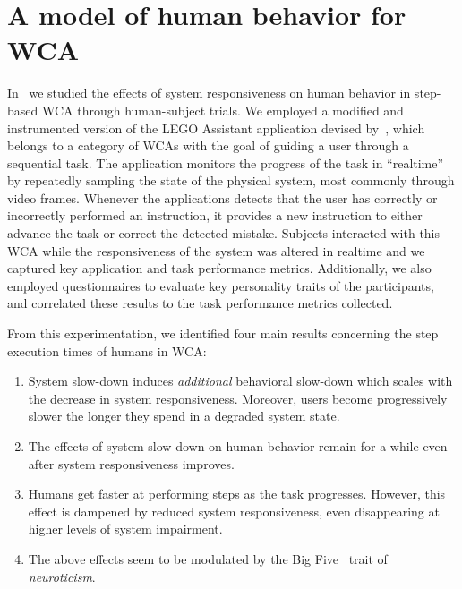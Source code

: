 \section{A model of human behavior for \acl*{WCA}}\label{sec:model}

In~\cite{olguinmunoz:impact2021} we studied the effects of system responsiveness on human behavior in step-based \ac{WCA} through human-subject trials.
We employed a modified and instrumented version of the LEGO Assistant application devised by~\textcite{Chen2015LEGO}, which belongs to a category of \acp{WCA} with the goal of guiding a user through a sequential task.
The application monitors the progress of the task in ``realtime'' by repeatedly sampling the state of the physical system, most commonly through video frames.
Whenever the applications detects that the user has correctly or incorrectly performed an instruction, it provides a new instruction to either advance the task or correct the detected mistake.
Subjects interacted with this \ac{WCA} while the responsiveness of the system was altered in realtime and we captured key application and task performance metrics.
Additionally, we also employed questionnaires to evaluate key personality traits of the participants, and correlated these results to the task performance metrics collected.

From this experimentation, we identified four main results concerning the step execution times of humans in \ac{WCA}:

\begin{enumerate}
    \item System slow-down induces \emph{additional} behavioral slow-down which scales with the decrease in system responsiveness.
    Moreover, users become progressively slower the longer they spend in a degraded system state.

    \item The effects of system slow-down on human behavior remain for a while even after system responsiveness improves.
    
    \item Humans get faster at performing steps as the task progresses. However, this effect is dampened by reduced system responsiveness, even disappearing at higher levels of system impairment.
    
    \item The above effects seem to be modulated by the Big Five~\cite{oliver:bfi1999} trait of \emph{neuroticism}.
\end{enumerate}

